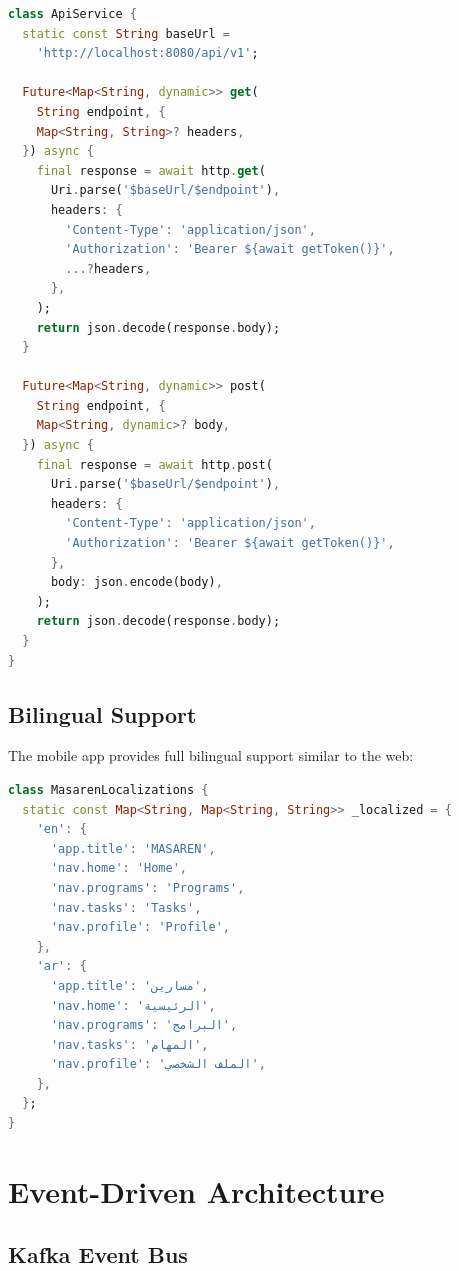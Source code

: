 \documentclass[11pt,a4paper]{article}
\begin{document}
\begin{lstlisting}[language=Dart, caption=API Service Layer]
class ApiService {
  static const String baseUrl =
    'http://localhost:8080/api/v1';

  Future<Map<String, dynamic>> get(
    String endpoint, {
    Map<String, String>? headers,
  }) async {
    final response = await http.get(
      Uri.parse('$baseUrl/$endpoint'),
      headers: {
        'Content-Type': 'application/json',
        'Authorization': 'Bearer ${await getToken()}',
        ...?headers,
      },
    );
    return json.decode(response.body);
  }

  Future<Map<String, dynamic>> post(
    String endpoint, {
    Map<String, dynamic>? body,
  }) async {
    final response = await http.post(
      Uri.parse('$baseUrl/$endpoint'),
      headers: {
        'Content-Type': 'application/json',
        'Authorization': 'Bearer ${await getToken()}',
      },
      body: json.encode(body),
    );
    return json.decode(response.body);
  }
}
\end{lstlisting}

\subsection{Bilingual Support}

The mobile app provides full bilingual support similar to the web:

\begin{lstlisting}[language=Dart, caption=Internationalization Setup]
class MasarenLocalizations {
  static const Map<String, Map<String, String>> _localized = {
    'en': {
      'app.title': 'MASAREN',
      'nav.home': 'Home',
      'nav.programs': 'Programs',
      'nav.tasks': 'Tasks',
      'nav.profile': 'Profile',
    },
    'ar': {
      'app.title': 'مسارين',
      'nav.home': 'الرئيسية',
      'nav.programs': 'البرامج',
      'nav.tasks': 'المهام',
      'nav.profile': 'الملف الشخصي',
    },
  };
}
\end{lstlisting}

\clearpage

\section{Event-Driven Architecture}

\subsection{Kafka Event Bus}
\end{document}
